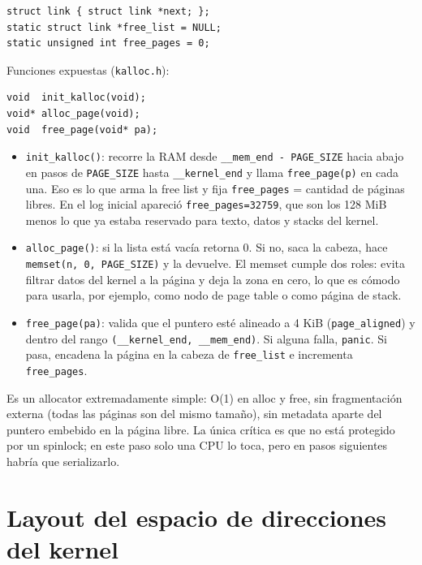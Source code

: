\documentclass[11pt,a4paper]{article}
\begin{document}
\begin{lstlisting}[style=cstyle]
struct link { struct link *next; };
static struct link *free_list = NULL;
static unsigned int free_pages = 0;
\end{lstlisting}

Funciones expuestas (\texttt{kalloc.h}):

\begin{lstlisting}[style=cstyle]
void  init_kalloc(void);
void* alloc_page(void);
void  free_page(void* pa);
\end{lstlisting}

\begin{itemize}[leftmargin=1.4em]
    \item \texttt{init\_kalloc()}: recorre la RAM desde
    \texttt{\_\_mem\_end - PAGE\_SIZE} hacia abajo en pasos de
    \texttt{PAGE\_SIZE} hasta \texttt{\_\_kernel\_end} y llama
    \texttt{free\_page(p)} en cada una. Eso es lo que arma la free list y fija
    \texttt{free\_pages} = cantidad de páginas libres. En el log inicial apareció
    \texttt{free\_pages=32759}, que son los 128 MiB menos lo que ya estaba
    reservado para texto, datos y stacks del kernel.
    \item \texttt{alloc\_page()}: si la lista está vacía retorna 0. Si no, saca la
    cabeza, hace \texttt{memset(n, 0, PAGE\_SIZE)} y la devuelve. El memset
    cumple dos roles: evita filtrar datos del kernel a la página y deja la zona
    en cero, lo que es cómodo para usarla, por ejemplo, como nodo de page table o
    como página de stack.
    \item \texttt{free\_page(pa)}: valida que el puntero esté alineado a 4 KiB
    (\texttt{page\_aligned}) y dentro del rango
    \texttt{(\_\_kernel\_end, \_\_mem\_end)}. Si alguna falla, \texttt{panic}. Si
    pasa, encadena la página en la cabeza de \texttt{free\_list} e incrementa
    \texttt{free\_pages}.
\end{itemize}

Es un allocator extremadamente simple: O(1) en alloc y free, sin fragmentación
externa (todas las páginas son del mismo tamaño), sin metadata aparte del puntero
embebido en la página libre. La única crítica es que no está protegido por un
spinlock; en este paso solo una CPU lo toca, pero en pasos siguientes habría que
serializarlo.

\section{Layout del espacio de direcciones del kernel}
\end{document}
